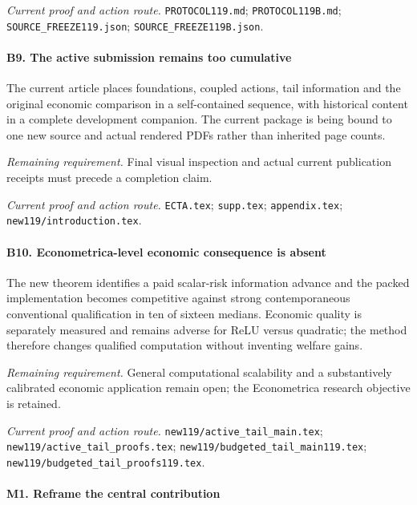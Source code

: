 \par\emph{Current proof and action route.} \nolinkurl{PROTOCOL119.md}; \nolinkurl{PROTOCOL119B.md}; \nolinkurl{SOURCE_FREEZE119.json}; \nolinkurl{SOURCE_FREEZE119B.json}.

\paragraph{B9. The active submission remains too cumulative}

The current article places foundations, coupled actions, tail information and the original economic comparison in a self-contained sequence, with historical content in a complete development companion. The current package is being bound to one new source and actual rendered PDFs rather than inherited page counts.

\par\emph{Remaining requirement.} Final visual inspection and actual current publication receipts must precede a completion claim.

\par\emph{Current proof and action route.} \nolinkurl{ECTA.tex}; \nolinkurl{supp.tex}; \nolinkurl{appendix.tex}; \nolinkurl{new119/introduction.tex}.

\paragraph{B10. Econometrica-level economic consequence is absent}

The new theorem identifies a paid scalar-risk information advance and the packed implementation becomes competitive against strong contemporaneous conventional qualification in ten of sixteen medians. Economic quality is separately measured and remains adverse for ReLU versus quadratic; the method therefore changes qualified computation without inventing welfare gains.

\par\emph{Remaining requirement.} General computational scalability and a substantively calibrated economic application remain open; the Econometrica research objective is retained.

\par\emph{Current proof and action route.} \nolinkurl{new119/active_tail_main.tex}; \nolinkurl{new119/active_tail_proofs.tex}; \nolinkurl{new119/budgeted_tail_main119.tex}; \nolinkurl{new119/budgeted_tail_proofs119.tex}.

\paragraph{M1. Reframe the central contribution}

